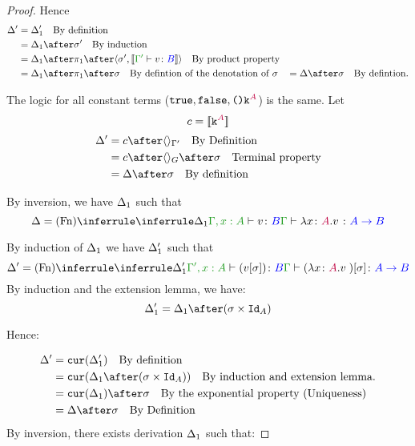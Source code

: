 \documentclass{report}
\begin{document}
\begin{framed}
\begin{proof}
        
        
        Hence
        \begin{align*}
            \D' & = \D_1' \qt{By definition}\\
                & = \D_1\after\si'\qt{By induction}\\
                & = \D_1\after\p\after\pr{\si'}{\deno{\typerelation{\G'}{v}{B}}}\qt{By product property}\\
                & = \D_1\after\p\after\si\qt{By defintion of the denotation of $\si$}
                & = \D\after\si\qt{By defintion.}
        \end{align*}
        
        \case{\vconst}
        The logic for all constant terms ($\texttt{true},\texttt{false},\texttt{()}\texttt{k}^{\color{purple} A}$) is the same.
        Let
        \begin{equation}
            c = {\bf [\![}\texttt{k}^{\color{purple} A}{\bf ]\!]}
        \end{equation}
        \begin{align*}
            \D' & = c\after\term{\G'}\qt{By Definition}\\
                & = c\after\term{G}\after\si\qt{Terminal property}\\
                & = \D\after\si\qt{By definition}
        \end{align*}
        \case{\vfun}
        
        By inversion, we have $\Delta_1$ such that
        \begin{equation}
            \D = \ntreeruleI{\vfun}{
                \treeruleI{\D_1}{\typerelation{\G, x:A}{v}{B}}
            }{\typerelation{\G}{\lam{x}{A}{v}}{\ab}}
        \end{equation}
        
        By induction of $\Delta_1$ we have $\Delta_1'$ such that
        \begin{equation}
            \D' = \ntreeruleI{\vfun}{
                \treeruleI{\D_1'}{\typerelation{\G', x:A}{(v\ssi)}{B}}
            }{\typerelation{\G}{(\lam{x}{A}{v})\ssi}{\ab}}
        \end{equation}
        By induction and the extension lemma, we have:
        \begin{equation}
            \D_1' = \D_1\after(\si\times\Id{A})
        \end{equation}
        
        Hence:
        
        \begin{align*}
            \D' &= \cur{\D_1'}\qt{By definition}\\
                &= \cur{\D_1\after(\si\times\Id{A})}\qt{By induction and extension lemma.}\\
                & = \cur{\D_1}\after\si\qt{By the exponential property (Uniqueness)}\\
                &= \D\after\si\qt{By Definition}\\
        \end{align*}
        \case{\vsubtype}
        By inversion, there exists derivation $\Delta_1$ such that:
        

\end{proof}
\end{framed}
\end{document}
